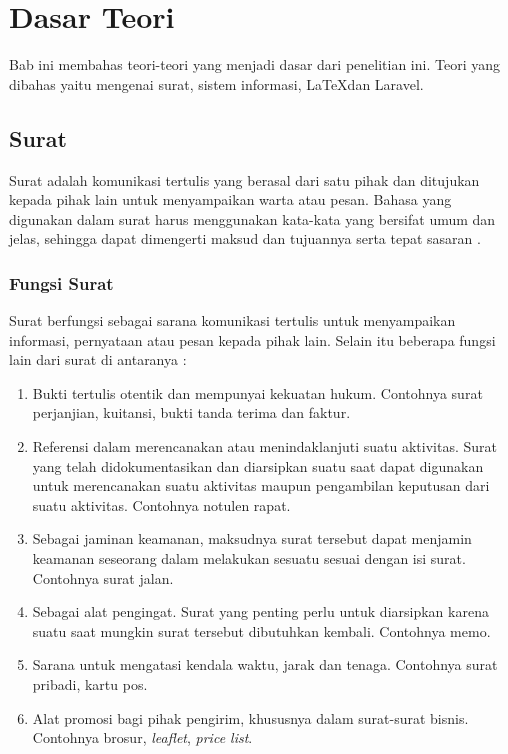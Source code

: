 \chapter{Dasar Teori}
\label{chap:dasar_teori}
Bab ini membahas teori-teori yang menjadi dasar dari penelitian ini. Teori yang dibahas yaitu mengenai surat, sistem informasi, \LaTeX dan Laravel.

\section{Surat}
\label{sec:surat}
Surat adalah komunikasi tertulis yang berasal dari satu pihak dan ditujukan kepada pihak lain untuk menyampaikan warta atau pesan. Bahasa yang digunakan dalam surat harus menggunakan kata-kata yang bersifat umum dan jelas, sehingga dapat dimengerti maksud dan tujuannya serta tepat sasaran \cite{Saiman:2002}.

\subsection{Fungsi Surat}
\label{sec:fungsi_surat}
Surat berfungsi sebagai sarana komunikasi tertulis untuk menyampaikan informasi, pernyataan atau pesan kepada pihak lain. Selain itu beberapa fungsi lain dari surat di antaranya \cite{Saiman:2002}:
\begin{enumerate}
	\item Bukti tertulis otentik dan mempunyai kekuatan hukum. Contohnya surat perjanjian, kuitansi, bukti tanda terima dan faktur.
	\item Referensi dalam merencanakan atau menindaklanjuti suatu aktivitas. Surat yang telah didokumentasikan dan diarsipkan suatu saat dapat digunakan untuk merencanakan suatu aktivitas maupun pengambilan keputusan dari suatu aktivitas. Contohnya notulen rapat.
	\item Sebagai jaminan keamanan, maksudnya surat tersebut dapat menjamin keamanan seseorang dalam melakukan sesuatu sesuai dengan isi surat. Contohnya surat jalan.
	\item Sebagai alat pengingat. Surat yang penting perlu untuk diarsipkan karena suatu saat mungkin surat tersebut dibutuhkan kembali. Contohnya memo.
	\item Sarana untuk mengatasi kendala waktu, jarak dan tenaga. Contohnya surat pribadi, kartu pos. 
	\item Alat promosi bagi pihak pengirim, khususnya dalam surat-surat bisnis. Contohnya brosur, \textit{leaflet}, \textit{price list}.
\end{enumerate}

